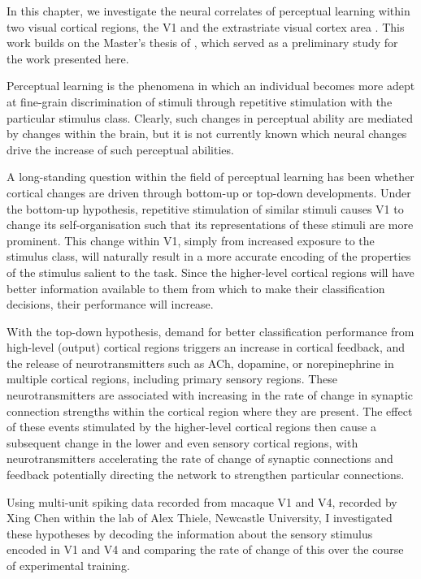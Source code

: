 
In this chapter, we investigate the neural correlates of perceptual learning within two visual cortical regions, the \acf{V1} and the extrastriate visual cortex area .
This work builds on the Master's thesis of \citet{Lowe2012}, which served as a preliminary study for the work presented here.

Perceptual learning is the phenomena in which an individual becomes more adept at fine-grain discrimination of stimuli through repetitive stimulation with the particular stimulus class.
Clearly, such changes in perceptual ability are mediated by changes within the brain, but it is not currently known which neural changes drive the increase of such perceptual abilities.

A long-standing question within the field of perceptual learning has been whether cortical changes are driven through bottom-up or top-down developments.
Under the bottom-up hypothesis, repetitive stimulation of similar stimuli causes \ac{V1} to change its self-organisation such that its representations of these stimuli are more prominent.
This change within \ac{V1}, simply from increased exposure to the stimulus class, will naturally result in a more accurate encoding of the properties of the stimulus salient to the task.
Since the higher-level cortical regions will have better information available to them from which to make their classification decisions, their performance will increase.

With the top-down hypothesis, demand for better classification performance from high-level (output) cortical regions triggers an increase in cortical feedback, and the release of neurotransmitters such as \ac{ACh}, dopamine, or norepinephrine in multiple cortical regions, including primary sensory regions.
These neurotransmitters are associated with increasing in the rate of change in synaptic connection strengths within the cortical region where they are present.
The effect of these events stimulated by the higher-level cortical regions then cause a subsequent change in the lower and even sensory cortical regions, with neurotransmitters accelerating the rate of change of synaptic connections and feedback potentially directing the network to strengthen particular connections.

Using multi-unit spiking data recorded from macaque \ac{V1} and \ac{V4}, recorded by Xing Chen within the lab of Alex Thiele, Newcastle University, I investigated these hypotheses by decoding the information about the sensory stimulus encoded in \ac{V1} and \ac{V4} and comparing the rate of change of this over the course of experimental training.
